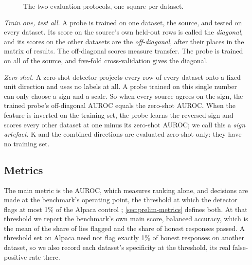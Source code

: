 \begin{figure}[t]
\centering
{}
\caption{The two evaluation protocols, one square per dataset.}
\label{fig:protocols}
\end{figure}

\emph{Train one, test all.} A probe is trained on one dataset, the source, and tested on every
dataset. Its score on the source's own held-out rows is called the \emph{diagonal}, and its scores
on the other datasets are the \emph{off-diagonal}, after their places in the matrix of results. The
off-diagonal scores measure transfer. The probe is trained on all of the source, and five-fold
cross-validation gives the diagonal.

\emph{Zero-shot.} A zero-shot detector projects every row of every dataset onto a fixed unit
direction and uses no labels at all. A probe trained on this single number can only choose a sign
and a scale. So when every source agrees on the sign, the trained probe's off-diagonal AUROC equals
the zero-shot AUROC. When the feature is inverted on the training set, the probe learns the reversed
sign and scores every other dataset at one minus its zero-shot AUROC; we call this a \emph{sign
artefact}. K and the combined directions are evaluated zero-shot only: they have no training set.

\subsection{Metrics}
\label{sec:metrics}

The main metric is the AUROC, which measures ranking alone, and decisions are made at the
benchmark's operating point, the threshold at which the detector flags at most 1\% of the Alpaca
control \cite{kretschmar2025liars}; \cref{sec:prelim-metrics} defines both. At that threshold we
report the benchmark's own main score, balanced accuracy, which is the mean of the share of lies
flagged and the share of honest responses passed. A threshold set on Alpaca need not flag exactly
1\% of honest responses on another dataset, so we also record each dataset's specificity at the
threshold, its real false-positive rate there.


